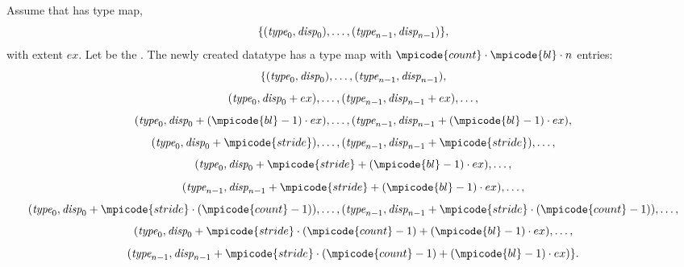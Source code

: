 Assume that  has type map,
\begin{displaymath}
\{ (\textrm{\itshape{type}}_0,\textrm{\itshape{disp}}_0), \ldots, (\textrm{\itshape{type}}_{n-1}, \textrm{\itshape{disp}}_{n-1}) \} ,
\end{displaymath}
with extent $ex$.  Let  be the .
The newly created  datatype has a type map with
$\mpicode{count} \cdot \mpicode{bl} \cdot n$
entries:
\begin{displaymath}
\{
(\textrm{\itshape{type}}_0, \textrm{\itshape{disp}}_0), \ldots , (\textrm{\itshape{type}}_{n-1} , \textrm{\itshape{disp}}_{n-1}),
\end{displaymath}
\begin{displaymath}
(\textrm{\itshape{type}}_0 ,\textrm{\itshape{disp}}_0 + ex) , \ldots ,
(\textrm{\itshape{type}}_{n-1} , \textrm{\itshape{disp}}_{n-1} + ex ), \ldots,
\end{displaymath}
\begin{displaymath}
(\mword{type}_0 , \mword{disp}_0 + (\mpicode{bl} -1) \cdot ex
) , \ldots , (\mword{type}_{n-1} , \mword{disp}_{n-1} + (\mpicode{bl} -1) \cdot ex ) ,
\end{displaymath}
\begin{displaymath}
(\mword{type}_0 ,\mword{disp}_0 + \mpicode{stride}  ) , \ldots ,
(\mword{type}_{n-1} , \mword{disp}_{n-1} + \mpicode{stride} ) , \ldots ,
\end{displaymath}
\begin{displaymath}
(\mword{type}_0 , \mword{disp}_0 + \mpicode{stride} + ( \mpicode{bl} -1) \cdot ex
) , \ldots ,
\end{displaymath}
\begin{displaymath}
(\mword{type}_{n-1}, \mword{disp}_{n-1} + \mpicode{stride} + (\mpicode{bl} -1) \cdot
ex ) ,
\ldots ,
\end{displaymath}
\begin{displaymath}
(\mword{type}_0 ,\mword{disp}_0 + \mpicode{stride} \cdot (\mpicode{count}-1) ) , \ldots ,
(\mword{type}_{n-1} , \mword{disp}_{n-1} + \mpicode{stride} \cdot (\mpicode{count} -1)  )
, \ldots ,
\end{displaymath}
\begin{displaymath}
(\mword{type}_0 , \mword{disp}_0 + \mpicode{stride} \cdot (\mpicode{count} -1)
+ (\mpicode{bl} -1) \cdot ex ) , \ldots ,
\end{displaymath}
\begin{displaymath}
(\mword{type}_{n-1}, \mword{disp}_{n-1} + \mpicode{stride} \cdot (\mpicode{count} -1)
+ (\mpicode{bl} -1) \cdot ex )
\} .
\end{displaymath}

